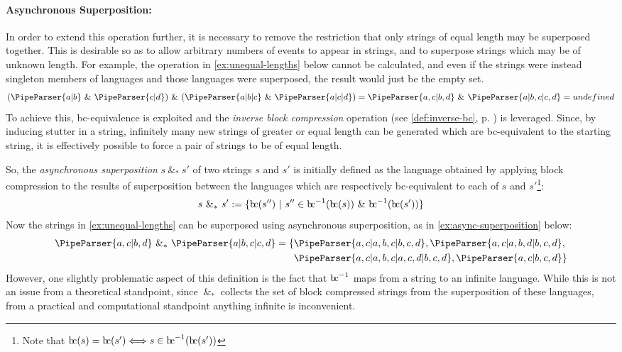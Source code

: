 \documentclass[a4paper,12pt,leqno]{article}
\newcommand{\bc}{{\rm b\!c}}
\newcommand{\vph}[1]{\vphantom{#1}}
\newcommand{\ebox}[1]{\fbox{$\vph{'(),}#1$}}
\renewcommand{\sp}{~\&~}
\newcommand{\spasync}{~\&_*~}
\newcommand{\EventString}[1]{%
	\renewcommand*{\do}[1]{\ebox{##1}}%
	\PipeParser{#1}%
}
\begin{document}
\paragraph{Asynchronous Superposition:}\label{para:str-op-sp-async}
In order to extend this operation further, it is necessary to remove the restriction that only strings of equal length may be superposed together. This is desirable so as to allow arbitrary numbers of events to appear in strings, and to superpose strings which may be of unknown length. For example, the operation in \cref{ex:unequal-lengths} below cannot be calculated, and even if the strings were instead singleton members of languages and those languages were superposed, the result would just be the empty set.
\begin{align}\label{ex:unequal-lengths}
	(\EventString{a|b} \sp \EventString{c|d}) \sp (\EventString{a|b|c} \sp \EventString{a|c|d})
	= \EventString{a,c|b,d} \sp \EventString{a|b,c|c,d}
	= undefined
\end{align}
To achieve this, \bc-equivalence is exploited and the \textit{inverse block compression} operation (see \cref{def:inverse-bc}, p. \pageref{def:inverse-bc}) is leveraged. Since, by inducing stutter in a string, infinitely many new strings of greater or equal length can be generated which are \bc-equivalent to the starting string, it is effectively possible to force a pair of strings to be of equal length.

So, the \textit{asynchronous superposition} $s \spasync s'$ of two strings $s$ and $s'$ is initially defined as the language obtained by applying block compression to the results of superposition between the languages which are respectively \bc-equivalent to each of $s$ and $s'$\footnote{Note that $\bc(s) = \bc(s') \Longleftrightarrow s \in \bc^{-1}(\bc(s'))$}:
\begin{align}\label{def:initial-async-superposition}
	s \spasync s' := \{\bc(s'') ~|~ s'' \in \bc^{-1}(\bc(s)) \sp \bc^{-1}(\bc(s'))\}
\end{align}
Now the strings in \cref{ex:unequal-lengths} can be superposed using asynchronous superposition, as in \cref{ex:async-superposition} below:
\begin{align}\label{ex:async-superposition}
	\EventString{a,c|b,d} \spasync \EventString{a|b,c|c,d} = \{&\EventString{a,c|a,b,c|b,c,d}, \EventString{a,c|a,b,d|b,c,d},\\&\EventString{a,c|a,b,c|a,c,d|b,c,d}, \EventString{a,c|b,c,d}\}\notag
\end{align}
However, one slightly problematic aspect of this definition is the fact that $\bc^{-1}$ maps from a string to an infinite language. While this is not an issue from a theoretical standpoint, since $\spasync$ collects the set of block compressed strings from the superposition of these languages, from a practical and computational standpoint anything infinite is inconvenient.
\end{document}
